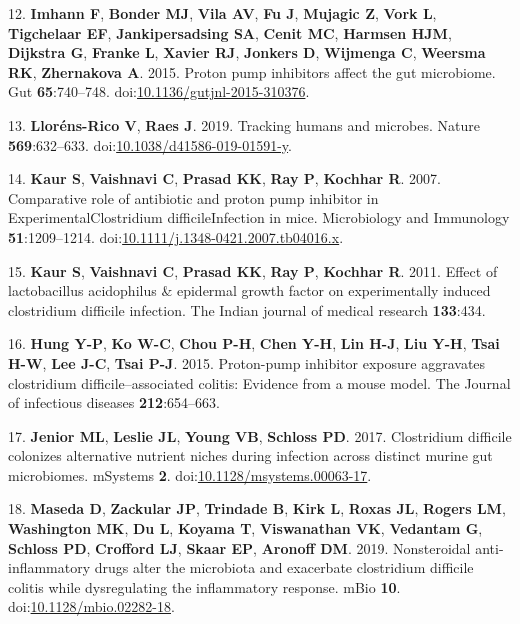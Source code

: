 \documentclass[11pt,]{article}
\begin{document}
\hypertarget{ref-Imhann2015}{}
12. \textbf{Imhann F}, \textbf{Bonder MJ}, \textbf{Vila AV}, \textbf{Fu
J}, \textbf{Mujagic Z}, \textbf{Vork L}, \textbf{Tigchelaar EF},
\textbf{Jankipersadsing SA}, \textbf{Cenit MC}, \textbf{Harmsen HJM},
\textbf{Dijkstra G}, \textbf{Franke L}, \textbf{Xavier RJ},
\textbf{Jonkers D}, \textbf{Wijmenga C}, \textbf{Weersma RK},
\textbf{Zhernakova A}. 2015. Proton pump inhibitors affect the gut
microbiome. Gut \textbf{65}:740--748.
doi:\href{https://doi.org/10.1136/gutjnl-2015-310376}{10.1136/gutjnl-2015-310376}.

\hypertarget{ref-LlornsRico2019}{}
13. \textbf{Lloréns-Rico V}, \textbf{Raes J}. 2019. Tracking humans and
microbes. Nature \textbf{569}:632--633.
doi:\href{https://doi.org/10.1038/d41586-019-01591-y}{10.1038/d41586-019-01591-y}.

\hypertarget{ref-Kaur2007}{}
14. \textbf{Kaur S}, \textbf{Vaishnavi C}, \textbf{Prasad KK},
\textbf{Ray P}, \textbf{Kochhar R}. 2007. Comparative role of antibiotic
and proton pump inhibitor in ExperimentalClostridium difficileInfection
in mice. Microbiology and Immunology \textbf{51}:1209--1214.
doi:\href{https://doi.org/10.1111/j.1348-0421.2007.tb04016.x}{10.1111/j.1348-0421.2007.tb04016.x}.

\hypertarget{ref-kaur2011effect}{}
15. \textbf{Kaur S}, \textbf{Vaishnavi C}, \textbf{Prasad KK},
\textbf{Ray P}, \textbf{Kochhar R}. 2011. Effect of lactobacillus
acidophilus \& epidermal growth factor on experimentally induced
clostridium difficile infection. The Indian journal of medical research
\textbf{133}:434.

\hypertarget{ref-hung2015proton}{}
16. \textbf{Hung Y-P}, \textbf{Ko W-C}, \textbf{Chou P-H}, \textbf{Chen
Y-H}, \textbf{Lin H-J}, \textbf{Liu Y-H}, \textbf{Tsai H-W}, \textbf{Lee
J-C}, \textbf{Tsai P-J}. 2015. Proton-pump inhibitor exposure aggravates
clostridium difficile--associated colitis: Evidence from a mouse model.
The Journal of infectious diseases \textbf{212}:654--663.

\hypertarget{ref-Jenior2017}{}
17. \textbf{Jenior ML}, \textbf{Leslie JL}, \textbf{Young VB},
\textbf{Schloss PD}. 2017. Clostridium difficile colonizes alternative
nutrient niches during infection across distinct murine gut microbiomes.
mSystems \textbf{2}.
doi:\href{https://doi.org/10.1128/msystems.00063-17}{10.1128/msystems.00063-17}.

\hypertarget{ref-Maseda2019}{}
18. \textbf{Maseda D}, \textbf{Zackular JP}, \textbf{Trindade B},
\textbf{Kirk L}, \textbf{Roxas JL}, \textbf{Rogers LM},
\textbf{Washington MK}, \textbf{Du L}, \textbf{Koyama T},
\textbf{Viswanathan VK}, \textbf{Vedantam G}, \textbf{Schloss PD},
\textbf{Crofford LJ}, \textbf{Skaar EP}, \textbf{Aronoff DM}. 2019.
Nonsteroidal anti-inflammatory drugs alter the microbiota and exacerbate
clostridium difficile colitis while dysregulating the inflammatory
response. mBio \textbf{10}.
doi:\href{https://doi.org/10.1128/mbio.02282-18}{10.1128/mbio.02282-18}.
\end{document}

